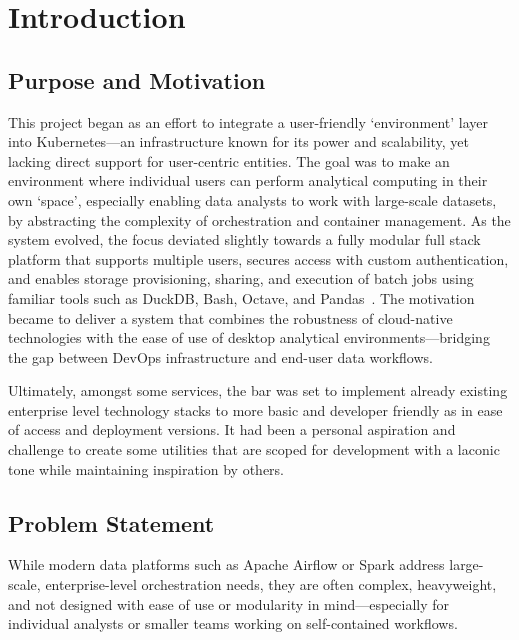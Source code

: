 \chapter{Introduction}
\label{Chapter-Introduction}

\section{Purpose and Motivation}
\hspace{2mm}This project began as an effort to integrate a user-friendly `environment' layer into Kubernetes—an infrastructure known 
for its power and scalability, yet lacking direct support for user-centric entities. The goal was to make 
an environment where individual users can perform analytical computing in their own `space', especially enabling
data analysts to work with large-scale datasets, by abstracting the complexity of orchestration and container management.
As the system evolved, the focus deviated slightly towards a fully modular full stack platform that supports multiple users, secures
access with custom authentication, and enables storage provisioning, sharing, and execution of batch jobs using familiar tools such
as DuckDB, Bash, Octave, and Pandas~\cite{mckinney-proc-scipy-2010}. The motivation became to deliver a system 
that combines the robustness of cloud-native
technologies with the ease of use of desktop analytical environments—bridging the gap between DevOps infrastructure and 
end-user data workflows.

Ultimately, amongst some services, the bar was set to implement already existing enterprise level technology stacks to 
more basic and developer friendly as in ease of access and deployment versions. It had been a personal aspiration and 
challenge to create some utilities that are scoped for development with a laconic tone while maintaining inspiration by others.

\newpage

\section{Problem Statement}

\hspace{2mm}While modern data platforms such as Apache Airflow or Spark 
address large-scale, enterprise-level orchestration needs, they are often complex, heavyweight, and 
not designed with ease of use or modularity in mind—especially for individual analysts or smaller 
teams working on self-contained workflows.

